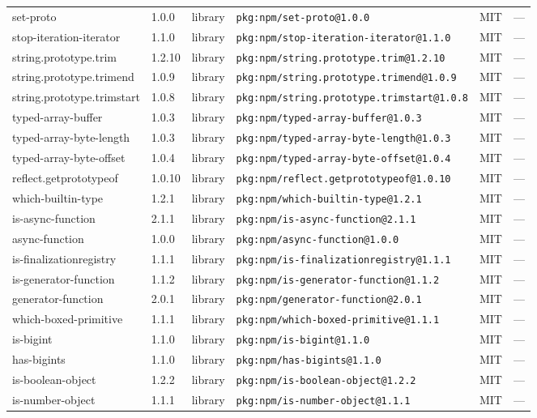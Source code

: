 \documentclass[11pt]{article}
\begin{document}
\begin{longtable}{|l|l|l|p{2.2cm}|l|p{4cm}|}
set-proto & 1.0.0 & library & \texttt{pkg:npm/set-proto@1.0.0} & MIT & — \\
stop-iteration-iterator & 1.1.0 & library & \texttt{pkg:npm/stop-iteration-iterator@1.1.0} & MIT & — \\
string.prototype.trim & 1.2.10 & library & \texttt{pkg:npm/string.prototype.trim@1.2.10} & MIT & — \\
string.prototype.trimend & 1.0.9 & library & \texttt{pkg:npm/string.prototype.trimend@1.0.9} & MIT & — \\
string.prototype.trimstart & 1.0.8 & library & \texttt{pkg:npm/string.prototype.trimstart@1.0.8} & MIT & — \\
typed-array-buffer & 1.0.3 & library & \texttt{pkg:npm/typed-array-buffer@1.0.3} & MIT & — \\
typed-array-byte-length & 1.0.3 & library & \texttt{pkg:npm/typed-array-byte-length@1.0.3} & MIT & — \\
typed-array-byte-offset & 1.0.4 & library & \texttt{pkg:npm/typed-array-byte-offset@1.0.4} & MIT & — \\
reflect.getprototypeof & 1.0.10 & library & \texttt{pkg:npm/reflect.getprototypeof@1.0.10} & MIT & — \\
which-builtin-type & 1.2.1 & library & \texttt{pkg:npm/which-builtin-type@1.2.1} & MIT & — \\
is-async-function & 2.1.1 & library & \texttt{pkg:npm/is-async-function@2.1.1} & MIT & — \\
async-function & 1.0.0 & library & \texttt{pkg:npm/async-function@1.0.0} & MIT & — \\
is-finalizationregistry & 1.1.1 & library & \texttt{pkg:npm/is-finalizationregistry@1.1.1} & MIT & — \\
is-generator-function & 1.1.2 & library & \texttt{pkg:npm/is-generator-function@1.1.2} & MIT & — \\
generator-function & 2.0.1 & library & \texttt{pkg:npm/generator-function@2.0.1} & MIT & — \\
which-boxed-primitive & 1.1.1 & library & \texttt{pkg:npm/which-boxed-primitive@1.1.1} & MIT & — \\
is-bigint & 1.1.0 & library & \texttt{pkg:npm/is-bigint@1.1.0} & MIT & — \\
has-bigints & 1.1.0 & library & \texttt{pkg:npm/has-bigints@1.1.0} & MIT & — \\
is-boolean-object & 1.2.2 & library & \texttt{pkg:npm/is-boolean-object@1.2.2} & MIT & — \\
is-number-object & 1.1.1 & library & \texttt{pkg:npm/is-number-object@1.1.1} & MIT & — \\

\end{longtable}
\end{document}
